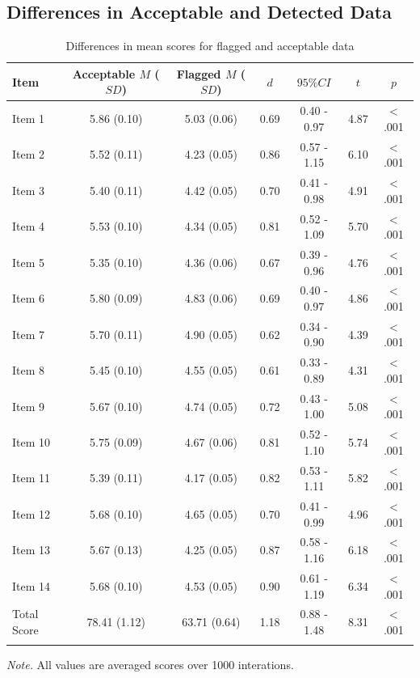 \documentclass[english,man]{apa6}
\theoremstyle{definition}
\theoremstyle{definition}
\theoremstyle{definition}
\theoremstyle{remark}
\begin{document}
\subsection{Differences in Acceptable and Detected
Data}\label{differences-in-acceptable-and-detected-data}

\begin{table}[tbp]
\begin{center}
\begin{threeparttable}
\caption{\label{tab:diff-table}Differences in mean scores for flagged and acceptable data}
\begin{tabular}{lcccccc}
\toprule
Item & Acceptable $M$ ($SD$) & Flagged $M$ ($SD$) & $d$ & $95\% CI$ & $t$ & $p$\\
\midrule
Item 1 & 5.86 (0.10) & 5.03 (0.06) & 0.69 & 0.40 - 0.97 & 4.87 & < .001\\
Item 2 & 5.52 (0.11) & 4.23 (0.05) & 0.86 & 0.57 - 1.15 & 6.10 & < .001\\
Item 3 & 5.40 (0.11) & 4.42 (0.05) & 0.70 & 0.41 - 0.98 & 4.91 & < .001\\
Item 4 & 5.53 (0.10) & 4.34 (0.05) & 0.81 & 0.52 - 1.09 & 5.70 & < .001\\
Item 5 & 5.35 (0.10) & 4.36 (0.06) & 0.67 & 0.39 - 0.96 & 4.76 & < .001\\
Item 6 & 5.80 (0.09) & 4.83 (0.06) & 0.69 & 0.40 - 0.97 & 4.86 & < .001\\
Item 7 & 5.70 (0.11) & 4.90 (0.05) & 0.62 & 0.34 - 0.90 & 4.39 & < .001\\
Item 8 & 5.45 (0.10) & 4.55 (0.05) & 0.61 & 0.33 - 0.89 & 4.31 & < .001\\
Item 9 & 5.67 (0.10) & 4.74 (0.05) & 0.72 & 0.43 - 1.00 & 5.08 & < .001\\
Item 10 & 5.75 (0.09) & 4.67 (0.06) & 0.81 & 0.52 - 1.10 & 5.74 & < .001\\
Item 11 & 5.39 (0.11) & 4.17 (0.05) & 0.82 & 0.53 - 1.11 & 5.82 & < .001\\
Item 12 & 5.68 (0.10) & 4.65 (0.05) & 0.70 & 0.41 - 0.99 & 4.96 & < .001\\
Item 13 & 5.67 (0.13) & 4.25 (0.05) & 0.87 & 0.58 - 1.16 & 6.18 & < .001\\
Item 14 & 5.68 (0.10) & 4.53 (0.05) & 0.90 & 0.61 - 1.19 & 6.34 & < .001\\
Total Score & 78.41 (1.12) & 63.71 (0.64) & 1.18 & 0.88 - 1.48 & 8.31 & < .001\\
\bottomrule
\addlinespace
\end{tabular}
\begin{tablenotes}[para]
\textit{Note.} All values are averaged scores over 1000 interations.
\end{tablenotes}
\end{threeparttable}
\end{center}
\end{table}
\end{document}
